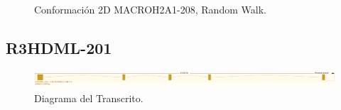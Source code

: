 \documentclass[a4paper,11pt,titlepage]{article}
\theoremstyle{definition}
\begin{document}
\begin{figure}[H]
\begin{minipage}[c]{0.23\textwidth}
        \caption{Conformación 2D MACROH2A1-208, Random Walk.}
        \label{fig:MACROH2A1-208-rndw}
    \end{minipage}
\end{figure}

\newpage
\subsection*{R3HDML-201}\label{subsec:gene5}

\begin{figure}[H]
    \centering
    \includegraphics[width=\textwidth]{images/R3HDML-201.png}
    \caption{Diagrama del Transcrito.}
    \label{fig:R3HDML-201-diag}
\end{figure}
\end{document}
